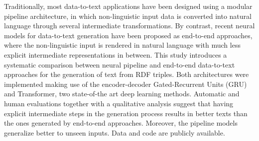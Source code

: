 Traditionally, most data-to-text applications have been designed using a modular pipeline architecture, in which non-linguistic input data is converted into natural language through several intermediate transformations. By contrast, recent neural models for data-to-text generation have been proposed as end-to-end approaches, where the non-linguistic input is rendered in natural language with much less explicit intermediate representations in between. This study introduces a systematic comparison between neural pipeline and end-to-end data-to-text approaches for the generation of text from RDF triples. Both architectures were implemented making use of the encoder-decoder Gated-Recurrent Units (GRU) and Transformer, two state-of-the art deep learning methods. Automatic and human evaluations together with a qualitative analysis suggest that having explicit intermediate steps in the generation process results in better texts than the ones generated by end-to-end approaches. Moreover, the pipeline models generalize better to unseen inputs. Data and code are  publicly available.